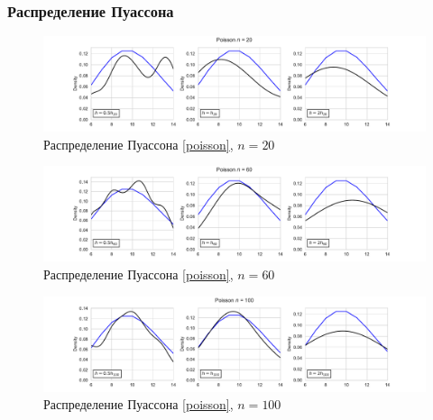\documentclass[a4paper]{article}
\begin{document}
\subsubsection{Распределение Пуассона}
\begin{figure}[H]
    \centering
    \includegraphics[width = 16 cm]{sources/poisKde20.pdf}
    \caption{Распределение Пуассона \eqref{poisson}, $n = 20$}
    \label{fig:poissonKDE20}
\end{figure}
\begin{figure}[H]
    \centering
    \includegraphics[width = 16 cm]{sources/poisKde60.pdf}
    \caption{Распределение Пуассона \eqref{poisson}, $n = 60$}
    \label{fig:poissonKDE60}
\end{figure}
\begin{figure}[H]
    \centering
    \includegraphics[width = 16 cm]{sources/poisKde100.pdf}
    \caption{Распределение Пуассона \eqref{poisson}, $n = 100$}
    \label{fig:poissonKDE100}
\end{figure}
\end{document}

